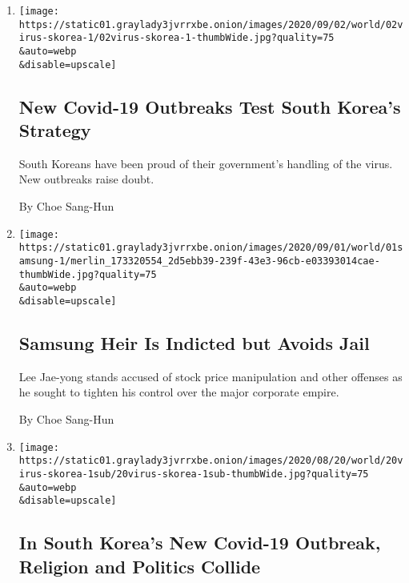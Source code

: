 \begin{enumerate}
\def\labelenumi{\arabic{enumi}.}
\item
  \href{/2020/09/02/world/asia/south-korea-covid-19.html}{}

  \texttt{[image: https://static01.graylady3jvrrxbe.onion/images/2020/09/02/world/02virus-skorea-1/02virus-skorea-1-thumbWide.jpg?quality=75\\\&auto=webp\\\&disable=upscale]}

  \hypertarget{new-covid-19-outbreaks-test-south-koreas-strategy}{%
  \subsection{New Covid-19 Outbreaks Test South Korea's
  Strategy}\label{new-covid-19-outbreaks-test-south-koreas-strategy}}

  South Koreans have been proud of their government's handling of the
  virus. New outbreaks raise doubt.

  By Choe Sang-Hun
\item
  \href{/2020/09/01/business/samsung-lee-south-korea-indicted.html}{}

  \texttt{[image: https://static01.graylady3jvrrxbe.onion/images/2020/09/01/world/01samsung-1/merlin\_173320554\_2d5ebb39-239f-43e3-96cb-e03393014cae-thumbWide.jpg?quality=75\\\&auto=webp\\\&disable=upscale]}

  \hypertarget{samsung-heir-is-indicted-but-avoids-jail}{%
  \subsection{Samsung Heir Is Indicted but Avoids
  Jail}\label{samsung-heir-is-indicted-but-avoids-jail}}

  Lee Jae-yong stands accused of stock price manipulation and other
  offenses as he sought to tighten his control over the major corporate
  empire.

  By Choe Sang-Hun
\item
  \href{/2020/08/20/world/asia/coronavirus-south-korea-church-sarang-jeil.html}{}

  \texttt{[image: https://static01.graylady3jvrrxbe.onion/images/2020/08/20/world/20virus-skorea-1sub/20virus-skorea-1sub-thumbWide.jpg?quality=75\\\&auto=webp\\\&disable=upscale]}

  \hypertarget{in-south-koreas-new-covid-19-outbreak-religion-and-politics-collide}{%
  \subsection{In South Korea's New Covid-19 Outbreak, Religion and
  Politics
  Collide}\label{in-south-koreas-new-covid-19-outbreak-religion-and-politics-collide}}


\end{enumerate}

